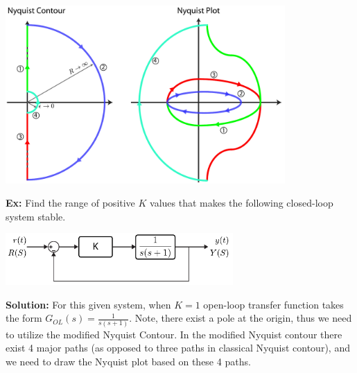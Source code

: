 \documentclass{article}
\begin{document}
  \begin{minipage}[h]{1\linewidth}
    \begin{center}
      \includegraphics[width=0.8\textwidth]{figs/originnyq}
    \end{center}
  \end{minipage}

\vspace{6 pt}

\newpage

\textbf{Ex:} Find the range of positive $K$ values that makes the
following closed-loop system stable. 

\vspace{12 pt}

  \begin{minipage}[h]{1\linewidth}
    \begin{center}
      \includegraphics[width=0.65\textwidth]{figs/ex5block}
    \end{center}
  \end{minipage}

\vspace{12 pt}

\textbf{Solution:} For this given system, when $K = 1$ open-loop
transfer function takes the form $ G_{OL}(s) = \frac{1}{s (s+1) }$. Note, there exist a pole at the origin, thus 
we need to utilize the modified Nyquist Contour. 
In the modified Nyquist contour there exist 4 major paths (as opposed to three paths in classical Nyquist contour), 
and we need to draw the Nyquist plot based on these 4 paths. 
\end{document}
